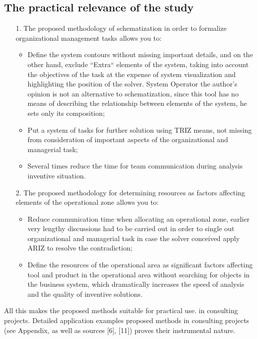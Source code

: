 \subsection{The practical relevance of the study}
\begin{itemize}
\item[1.] The proposed methodology of schematization in order to formalize organizational
management tasks allows you to:
\begin{itemize}
\item Define the system contours without missing important details, and on the
  other hand, exclude “Extra“ elements of the system, taking into account the
  objectives of the task at the expense of system visualization and
  highlighting the position of the solver. System Operator the author’s
  opinion is not an alternative to schematization, since this tool has no
  means of describing the relationship between elements of the system, he sets
  only its composition;
\item Put a system of tasks for further solution using TRIZ means, not missing
  from consideration of important aspects of the organizational and managerial
  task;
\item Several times reduce the time for team communication during analysis
inventive situation.
\end{itemize}
\item [2.] The proposed methodology for determining resources as factors
  affecting elements of the operational zone allows you to:
\begin{itemize}
\item Reduce communication time when allocating an operational zone, earlier
  very lengthy discussions had to be carried out in order to single out
  organizational and managerial task in case the solver conceived apply ARIZ
  to resolve the contradiction;
\item Define the resources of the operational area as significant factors
  affecting tool and product in the operational area without searching for
  objects in the business system, which dramatically increases the speed of
  analysis and the quality of inventive solutions.
\end{itemize}
\end{itemize}
All this makes the proposed methods suitable for practical use.
in consulting projects. Detailed application examples
proposed methods in consulting projects (see Appendix, as well as sources
[6], [11]) proves their instrumental nature.

